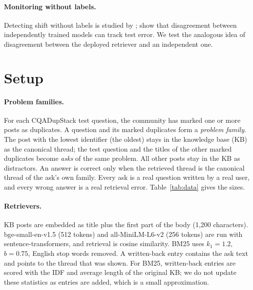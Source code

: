 \documentclass[11pt]{article}
\begin{document}
\paragraph{Monitoring without labels.} Detecting shift without labels is studied by \citet{rabanser2019failing}; \citet{jiang2022disagreement} show that disagreement between independently trained models can track test error. We test the analogous idea of disagreement between the deployed retriever and an independent one.

\section{Setup}
\label{sec:setup}
\paragraph{Problem families.} For each CQADupStack test question, the community has marked one or more posts as duplicates. A question and its marked duplicates form a \emph{problem family}. The post with the lowest identifier (the oldest) stays in the knowledge base (KB) as the canonical thread; the test question and the titles of the other marked duplicates become \emph{asks} of the same problem. All other posts stay in the KB as distractors. An answer is correct only when the retrieved thread is the canonical thread of the ask's own family. Every ask is a real question written by a real user, and every wrong answer is a real retrieval error. Table~\ref{tab:data} gives the sizes.

\begin{table}[t]\centering\small

\caption{The twelve CQADupStack forums as used here. ``Repeat asks'' are asks of a family beyond its first ask.}
\label{tab:data}
\end{table}

\paragraph{Retrievers.} KB posts are embedded as title plus the first part of the body (1{,}200 characters). bge-small-en-v1.5 (512 tokens) and all-MiniLM-L6-v2 (256 tokens) are run with sentence-transformers, and retrieval is cosine similarity. BM25 uses $k_1=1.2$, $b=0.75$, English stop words removed. A written-back entry contains the ask text and points to the thread that was shown. For BM25, written-back entries are scored with the IDF and average length of the original KB; we do not update these statistics as entries are added, which is a small approximation.
\end{document}
